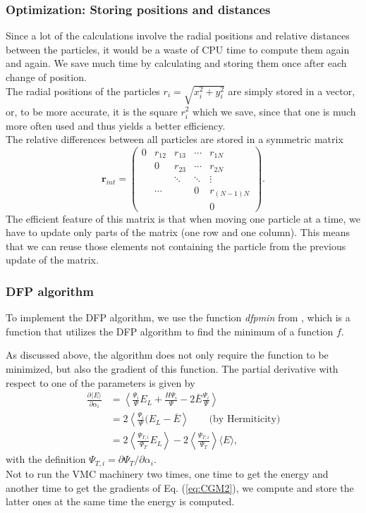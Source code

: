 \subsubsection{Optimization: Storing positions and distances}
Since a lot of the calculations involve the radial positions and relative distances between the particles, it would be a waste of CPU time to compute them again and again. We save much time by calculating and storing them once after each change of position.\\
The radial positions of the particles $r_i = \sqrt{x_i^2 + y_i^ 2}$ are simply stored in a vector, or, to be more accurate, it is the square $r_i^2$ which we save, since
that one is much more often used and thus yields a better efficiency.\\
The relative differences between all particles are stored in a symmetric matrix
\[ \mathbf{r}_{int} = 
 \left( \begin{array}{ccccc}
0 & r_{12} & r_{13} & \cdots & r_{1N} \\
 & 0 & r_{23} &\cdots & r_{2N} \\
 & & \ddots & \ddots & \vdots\\
 & \cdots& &0  & r_{(N-1)N}\\
 & & & & 0
 \end{array}
\right). 
\]
The efficient feature of this matrix is that when moving one particle at a time, we have to update only parts of the matrix (one row and one column). This means that we can reuse those elements not containing the particle from the previous update of the matrix.


\subsubsection{DFP algorithm}
To implement the DFP algorithm, we use the function \textit{dfpmin} from \cite{vetterling2002numerical}, which is a function that utilizes the DFP algorithm to find the minimum of a function $f$.

As discussed above, the algorithm does not only require the function to be minimized, but also the gradient of this function.
The partial derivative with respect to one of the parameters is given by
\begin{align}
\frac{\partial \langle E \rangle}{\partial \alpha_i} &= \left\langle \frac{\Psi_i}{\Psi}E_L + \frac{H \Psi_i}{\Psi} - 2 \bar{E} \frac{\Psi_i}{\Psi}  \right\rangle \\
& = 2 \left\langle \frac{\Psi_i}{\Psi}(E_L - \bar{E}\right\rangle \qquad \text{(by Hermiticity)} \\
&=  2\left\langle \frac{\Psi_{T,i}}{\Psi_T} E_L \right\rangle -2 \left\langle   \frac{\Psi_{T,i}}{\Psi_T} \right\rangle \langle E \rangle,
\label{eq:CGM2}
\end{align}
with the definition $\Psi_{T,i} = \partial \Psi_T /\partial \alpha_i$. \\
Not to run the VMC machinery two times, one time to get the energy and another time to get the gradients of Eq. (\ref{eq:CGM2}), we compute and store the latter ones at the same time the energy is computed.

